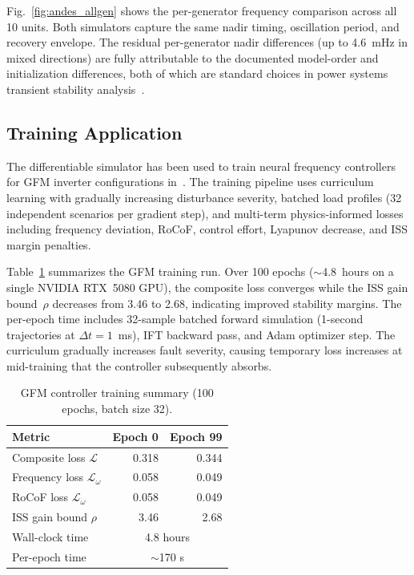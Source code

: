\documentclass[11pt]{article}
\begin{document}
Fig.~\ref{fig:andes_allgen} shows the per-generator frequency
comparison across all 10 units.  Both simulators capture the same
nadir timing, oscillation period, and recovery envelope.  The residual
per-generator nadir differences (up to 4.6~mHz in mixed directions)
are fully attributable to the documented model-order and
initialization differences, both of which are standard choices in
power systems transient stability analysis~\cite{Kundur94PowerSystems,
SauerPai98}.

\subsection{Training Application}
\label{sec:training}

The differentiable simulator has been used to train neural frequency
controllers for GFM inverter configurations
in~\cite{AlduaijWeng25SGC}.  The
training pipeline uses curriculum learning with gradually increasing
disturbance severity, batched load profiles (32 independent scenarios
per gradient step), and multi-term physics-informed losses including
frequency deviation, RoCoF, control effort, Lyapunov decrease, and ISS
margin penalties.

Table~\ref{tab:training} summarizes the GFM training run.  Over 100
epochs ($\sim$4.8~hours on a single NVIDIA RTX~5080 GPU), the composite
loss converges while the ISS gain bound~$\rho$ decreases from 3.46 to
2.68, indicating improved stability margins.  The per-epoch time
includes 32-sample batched forward simulation (1-second trajectories
at $\Delta t = 1$~ms), IFT backward pass, and Adam optimizer step.
The curriculum gradually increases fault severity, causing temporary
loss increases at mid-training that the controller subsequently
absorbs.

\begin{table}[t]
\centering
\caption{GFM controller training summary (100 epochs, batch size 32).}
\label{tab:training}
\small
\begin{tabular}{lrr}
\toprule
\textbf{Metric} & \textbf{Epoch 0} & \textbf{Epoch 99} \\
\midrule
Composite loss $\mathcal{L}$         & 0.318 & 0.344 \\
Frequency loss $\mathcal{L}_\omega$  & 0.058 & 0.049 \\
RoCoF loss $\mathcal{L}_{\dot\omega}$ & 0.058 & 0.049 \\
ISS gain bound $\rho$                & 3.46  & 2.68  \\
\midrule
Wall-clock time                      & \multicolumn{2}{c}{4.8 hours} \\
Per-epoch time                       & \multicolumn{2}{c}{$\sim$170 s} \\
\bottomrule
\end{tabular}
\end{table}
\end{document}

